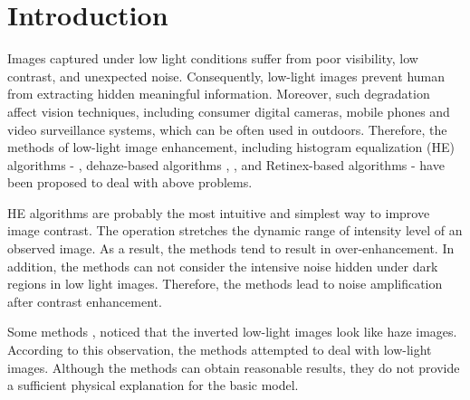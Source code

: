 \chapter{Introduction}
\label{sec:intro}
 Images captured under low light conditions suffer from poor visibility, low contrast, and unexpected noise. Consequently, low-light images prevent human from extracting hidden meaningful information. Moreover, such degradation affect vision techniques, including consumer digital cameras, mobile phones and video surveillance systems, which can be often used in outdoors. Therefore, the methods of low-light image enhancement, including histogram equalization (HE) algorithms \cite{he1} - \cite{he3}, dehaze-based algorithms \cite{haze1}, \cite{haze2}, and Retinex-based algorithms\cite{ssr} - \cite{rrm} have been proposed to deal with above problems. \par
HE algorithms are probably the most intuitive and simplest way to improve image contrast. The operation stretches the dynamic range of intensity level of an observed image. As a result, the methods tend to result in over-enhancement. In addition, the methods can not consider the intensive noise hidden under dark regions in low light images. Therefore, the methods lead to noise amplification after contrast enhancement.\par
Some methods \cite{haze1}, \cite{haze2} noticed that the inverted low-light images look like haze images. According to this observation, the methods attempted to deal with low-light images. Although the methods can obtain reasonable results, they do not provide a sufficient physical explanation for the basic model.
